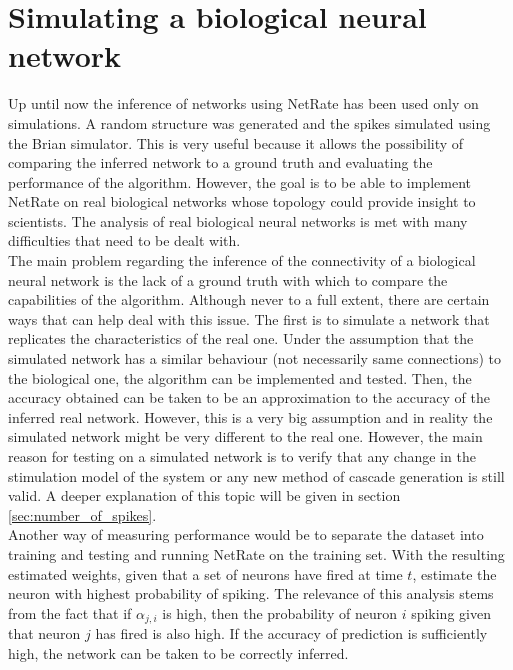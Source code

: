 
\chapter{Simulating a biological neural network}\label{chap:simulating}

Up until now the inference of networks using NetRate has been used only on simulations. A random structure was generated and the spikes simulated using the Brian simulator. This is very useful because it allows the possibility of comparing the inferred network to a ground truth and evaluating the performance of the algorithm. However, the goal is to be able to implement NetRate on real biological networks whose topology could provide insight to scientists. The analysis of real biological neural networks is met with many difficulties that need to be dealt with.\\

The main problem regarding the inference of the connectivity of a biological neural network is the lack of a ground truth with which to compare the capabilities of the algorithm. Although never to a full extent, there are certain ways that can help deal with this issue. The first is to simulate a network that replicates the characteristics of the real one. Under the assumption that the simulated network has a similar behaviour (not necessarily same connections) to the biological one, the algorithm can be implemented and tested. Then, the accuracy obtained can be taken to be an approximation to the accuracy of the inferred real network. However, this is a very big assumption and in reality the simulated network might be very different to the real one. However, the main reason for testing on a simulated network is to verify that any change in the stimulation model of the system or any new method of cascade generation is still valid. A deeper explanation of this topic will be given in section \ref{sec:number_of_spikes}.\\

Another way of measuring performance would be to separate the dataset into training and testing and running NetRate on the training set. With the resulting estimated weights, given that a set of neurons have fired at time \(t\), estimate the neuron with highest probability of spiking. The relevance of this analysis stems from the fact that if \(\alpha_{j,i}\) is high, then the probability of neuron \(i\) spiking given that neuron \(j\) has fired is also high. If the accuracy of prediction is sufficiently high, the network can be taken to be correctly inferred.\\

